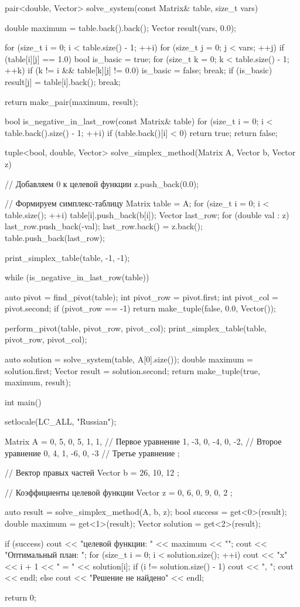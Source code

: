 \documentclass{report}
\begin{document}
\begin{code}
pair<double, Vector> solve_system(const Matrix& table, size_t vars) {
	double maximum = table.back().back();
	Vector result(vars, 0.0);
	
	for (size_t i = 0; i < table.size() - 1; ++i) {
		for (size_t j = 0; j < vars; ++j) {
			if (table[i][j] == 1.0) {
				bool is_basic = true;
				for (size_t k = 0; k < table.size() - 1; ++k) {
					if (k != i && table[k][j] != 0.0) {
						is_basic = false;
						break;
					}
				}
				if (is_basic) {
					result[j] = table[i].back();
					break;
				}
			}
		}
	}
	
	return make_pair(maximum, result);
}

bool is_negative_in_last_row(const Matrix& table) {
	for (size_t i = 0; i < table.back().size() - 1; ++i) {
		if (table.back()[i] < 0) {
			return true;
		}
	}
	return false;
}

tuple<bool, double, Vector> solve_simplex_method(Matrix A, Vector b, Vector z) {
	// Добавляем 0 к целевой функции
	z.push_back(0.0);
	
	// Формируем симплекс-таблицу
	Matrix table = A;
	for (size_t i = 0; i < table.size(); ++i) {
		table[i].push_back(b[i]);
	}
	Vector last_row;
	for (double val : z) {
		last_row.push_back(-val);
	}
	last_row.back() = z.back();
	table.push_back(last_row);
	
	print_simplex_table(table, -1, -1);
	
	while (is_negative_in_last_row(table)) {
		auto pivot = find_pivot(table);
		int pivot_row = pivot.first;
		int pivot_col = pivot.second;
		if (pivot_row == -1) {
			return make_tuple(false, 0.0, Vector());
		}
		
		perform_pivot(table, pivot_row, pivot_col);
		print_simplex_table(table, pivot_row, pivot_col);
	}
	
	auto solution = solve_system(table, A[0].size());
	double maximum = solution.first;
	Vector result = solution.second;
	return make_tuple(true, maximum, result);
}

int main() {
	setlocale(LC_ALL, "Russian");

	Matrix A = {
		{0, 5, 0, 5, 1, 1},  // Первое уравнение
		{1, -3, 0, -4, 0, -2}, // Второе уравнение
		{0, 4, 1, -6, 0, -3}   // Третье уравнение
	};
	
	// Вектор правых частей
	Vector b = { 26, 10, 12 };
	
	// Коэффициенты целевой функции 
	Vector z = { 0, 6, 0, 9, 0, 2 };
	
	auto result = solve_simplex_method(A, b, z);
	bool success = get<0>(result);
	double maximum = get<1>(result);
	Vector solution = get<2>(result);
	
	if (success) {
		cout << " целевой функции: " << maximum << "\n";
		cout << "Оптимальный план: ";
		for (size_t i = 0; i < solution.size(); ++i) {
			cout << "x" << i + 1 << " = " << solution[i];
			if (i != solution.size() - 1) cout << ", ";
		}
		cout << endl;
	}
	else {
		cout << "Решение не найдено" << endl;
	}
	
	return 0;
}
	\end{code}
	
\end{document}
